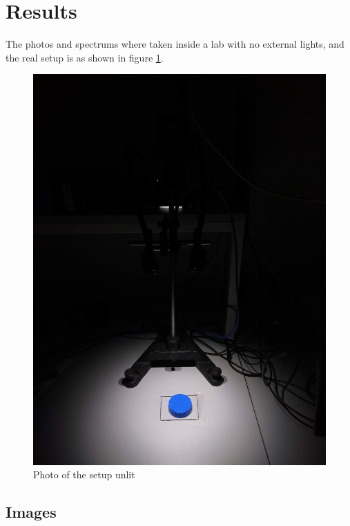 \section{Results}
The photos and spectrums where taken inside a lab with no external lights, and the real setup is as shown in figure \ref{fig:picture_of_setup_unlit}. %

\begin{figure}[h]
    \centering
    \includegraphics[width=1\textwidth]{figures/picture_taking_in_the_dark}
    \caption{Photo of the setup unlit}
    \label{fig:picture_of_setup_unlit}
\end{figure}


\subsection{Images}

